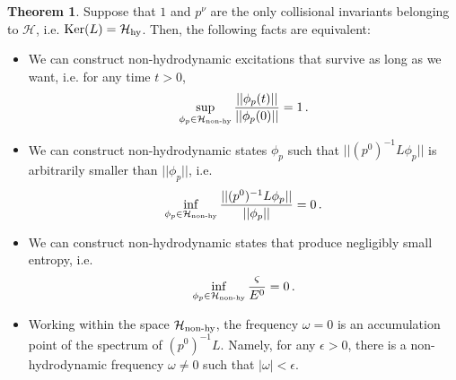 \documentclass[a4paper, amsfonts, amssymb, amsmath, reprint, showkeys, nofootinbib, twoside, onecolumn,notitlepage,,longbibliography]{revtex4-2}
\theoremstyle{definition}
\theoremstyle{theorem}
\newtheorem{theorem}{Theorem}
\theoremstyle{corollary}
\begin{document}
\begin{theorem}\label{theo1}
Suppose that $1$ and $p^\nu$ are the only collisional invariants belonging to $\mathcal{H}$, i.e. $\textup{Ker}(L)= \mathcal{H}_{\textup{hy}}$.  Then, the following facts are equivalent:
\begin{itemize}
\item[\textup{(a)}] We can construct non-hydrodynamic excitations that survive as long as we want, i.e. for any time $t>0$,
\begin{equation}\label{survival}
   \sup_{\phi_p \in \mathcal{H}_{\textup{non-hy}}}  \dfrac{|| \phi_p(t)||}{|| \phi_p(0) ||} =1 \, .
\end{equation}
\item[\textup{(b)}] We can construct non-hydrodynamic states $\phi_p$ such that $||(p^0)^{-1}L\phi_p ||$ is arbitrarily smaller than $|| \phi_p ||$, i.e.
\begin{equation}\label{superuzzuz}
    \inf_{\phi_p \in \mathcal{H}_{\textup{non-hy}}} \dfrac{|| (p^0)^{-1} L \phi_p ||}{||\phi_p||} =0 \, .
\end{equation} 
\item[\textup{(c)}] We can construct non-hydrodynamic states that produce negligibly small entropy, i.e.
\begin{equation}\label{entropona}
    \inf_{\phi_p \in \mathcal{H}_{\textup{non-hy}}} \dfrac{\varsigma}{E^0} =0 \, .
\end{equation}
\item[\textup{(d)}] Working within the space $\mathcal{H}_{\textup{non-hy}}$, the frequency $\omega=0$ is an accumulation point of the spectrum of $(p^0)^{-1}L$. Namely, for any $\epsilon>0$, there is a non-hydrodynamic frequency $\omega \neq 0$ such that $|\omega|<\epsilon$.
\end{itemize}
\end{theorem}
\end{document}
